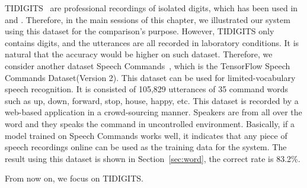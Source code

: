 TIDIGITS~\cite{leonard1993tidigits} are professional recordings of isolated digits, which has been used in~\cite{michalevsky2014gyrophone} and \cite{anand2019spearphone}. Therefore, in the main sessions of this chapter, we illustrated our system using this dataset for the comparison's purpose. However, TIDIGITS only contains digits, and the utterances are all recorded in laboratory conditions. It is natural that the accuracy would be higher on such dataset. Therefore, we consider another dataset Speech Commands~\cite{warden2018speech}, which  is the TensorFlow Speech Commands Dataset(Version 2). This dataset can be used for limited-vocabulary speech recognition. It is consisted of 105,829 utterances of 35 command words such as up, down, forward, stop, house, happy, etc. This dataset is recorded by a web-based application in a crowd-sourcing manner. Speakers are from all over the word and they speaks the command in uncontrolled environment. Basically, if a model trained on Speech Commands works well, it indicates that any piece of speech recordings online can be used as the training data for the {\systemName} system. The result using this dataset is shown in Section~\ref{sec:word}, the correct rate is 83.2\%.



From now on, we focus on TIDIGITS.

